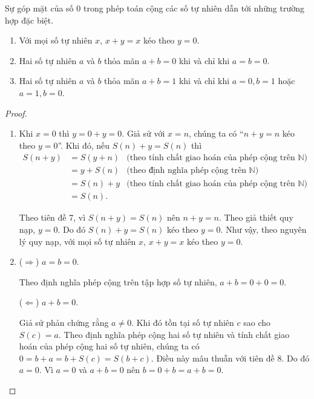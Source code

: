 Sự góp mặt của số $0$ trong phép toán cộng các số tự nhiên dẫn tới những trường hợp đặc biệt.
\begin{theorem}\label{theorem:addition-and-zero}
    \begin{enumerate}[label={(\roman*)}]
        \item Với mọi số tự nhiên $x$, $x + y = x$ kéo theo $y = 0$.
        \item Hai số tự nhiên $a$ và $b$ thỏa mãn $a + b = 0$ khi và chỉ khi $a = b = 0$.
        \item Hai số tự nhiên $a$ và $b$ thỏa mãn $a + b = 1$ khi và chỉ khi $a = 0, b = 1$ hoặc $a = 1, b = 0$.
    \end{enumerate}
\end{theorem}

\begin{proof}
    \begin{enumerate}[label={(\roman*)}]
        \item Khi $x = 0$ thì $y = 0 + y = 0$. Giả sử với $x = n$, chúng ta có ``$n + y = n$ kéo theo $y = 0$''. Khi đó, nếu $S(n) + y = S(n)$ thì
              \begin{align*}
                  S(n + y) & = S(y + n) & \text{(theo tính chất giao hoán của phép cộng trên $\mathbb{N}$)} \\
                           & = y + S(n) & \text{(theo định nghĩa phép cộng trên $\mathbb{N}$)}              \\
                           & = S(n) + y & \text{(theo tính chất giao hoán của phép cộng trên $\mathbb{N}$)} \\
                           & = S(n).
              \end{align*}

              Theo tiên đề 7, vì $S(n + y) = S(n)$ nên $n + y = n$. Theo giả thiết quy nạp, $y = 0$. Do đó $S(n) + y = S(n)$ kéo theo $y = 0$. Như vậy, theo nguyên lý quy nạp, với mọi số tự nhiên $x$, $x + y = x$ kéo theo $y = 0$.
        \item ($\Rightarrow$) $a = b = 0$.

              Theo định nghĩa phép cộng trên tập hợp số tự nhiên, $a + b = 0 + 0 = 0$.

              ($\Leftarrow$) $a + b = 0$.

              Giả sử phản chứng rằng $a\ne 0$. Khi đó tồn tại số tự nhiên $c$ sao cho $S(c) = a$. Theo định nghĩa phép cộng hai số tự nhiên và tính chất giao hoán của phép cộng hai số tự nhiên, chúng ta có $0 = b + a = b + S(c) = S(b + c)$. Điều này mâu thuẫn với tiên đề 8. Do đó $a = 0$. Vì $a = 0$ và $a + b = 0$ nên $b = 0 + b = a + b = 0$.


\end{enumerate}
\end{proof}
